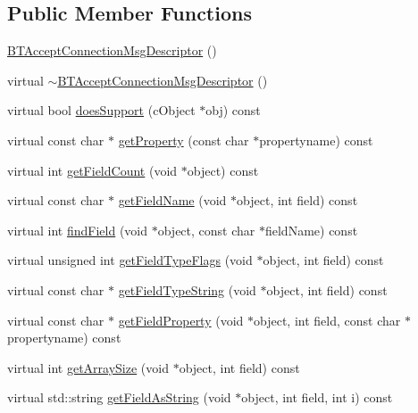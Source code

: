\subsection*{Public Member Functions}
\begin{DoxyCompactItemize}
\item 
\hyperlink{classBTAcceptConnectionMsgDescriptor_a766c5d3f8ebf42a0cc1e4f714a0eb7bd}{B\+T\+Accept\+Connection\+Msg\+Descriptor} ()
\item 
virtual \hyperlink{classBTAcceptConnectionMsgDescriptor_ac5a7d4056ac48b6fca0b242a815a15fb}{$\sim$\+B\+T\+Accept\+Connection\+Msg\+Descriptor} ()
\item 
virtual bool \hyperlink{classBTAcceptConnectionMsgDescriptor_af2bea1ff61237e2d2ccc4bf51ed24fe8}{does\+Support} (c\+Object $\ast$obj) const 
\item 
virtual const char $\ast$ \hyperlink{classBTAcceptConnectionMsgDescriptor_ae47f50e132976322da1cd07d0ad4c3fc}{get\+Property} (const char $\ast$propertyname) const 
\item 
virtual int \hyperlink{classBTAcceptConnectionMsgDescriptor_ad65eaa39ce85d13a42ebcd154967782d}{get\+Field\+Count} (void $\ast$object) const 
\item 
virtual const char $\ast$ \hyperlink{classBTAcceptConnectionMsgDescriptor_a7cbe9fed52815e731953d278064480f4}{get\+Field\+Name} (void $\ast$object, int field) const 
\item 
virtual int \hyperlink{classBTAcceptConnectionMsgDescriptor_a944bc7e9212f7afc2f112b0d8deb60a6}{find\+Field} (void $\ast$object, const char $\ast$field\+Name) const 
\item 
virtual unsigned int \hyperlink{classBTAcceptConnectionMsgDescriptor_aa8e57d70b5626672cc9c2e18136f6ff0}{get\+Field\+Type\+Flags} (void $\ast$object, int field) const 
\item 
virtual const char $\ast$ \hyperlink{classBTAcceptConnectionMsgDescriptor_a936107d9f6e0c6c8956f24990462c5a2}{get\+Field\+Type\+String} (void $\ast$object, int field) const 
\item 
virtual const char $\ast$ \hyperlink{classBTAcceptConnectionMsgDescriptor_ac1de115d9067ad159248e4d8b1b623cd}{get\+Field\+Property} (void $\ast$object, int field, const char $\ast$propertyname) const 
\item 
virtual int \hyperlink{classBTAcceptConnectionMsgDescriptor_a56ba4d2d80ea9723cda67721b1716dc3}{get\+Array\+Size} (void $\ast$object, int field) const 
\item 
virtual std\+::string \hyperlink{classBTAcceptConnectionMsgDescriptor_af51e361233f5a13c7f4d962f11b2828b}{get\+Field\+As\+String} (void $\ast$object, int field, int i) const 

\end{DoxyCompactItemize}
